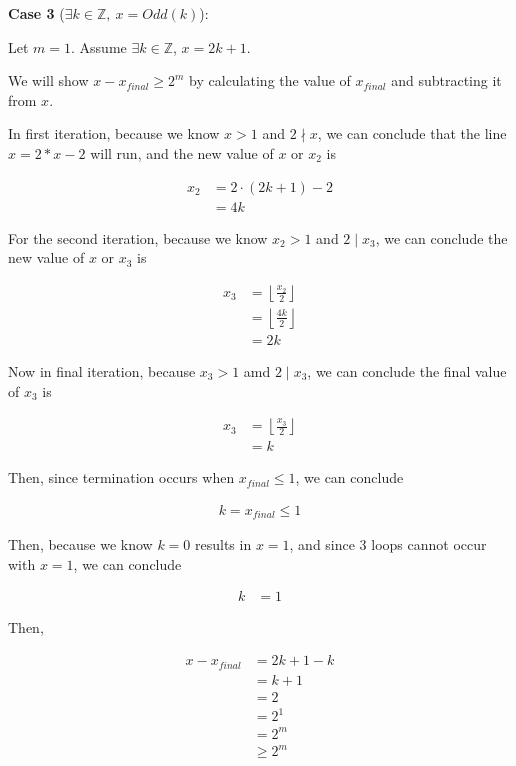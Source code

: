 \documentclass[12pt]{article}
\begin{document}
\begin{enumerate}[a.]
    \textbf{Case 3} ($\exists k \in \mathbb{Z},\:x = Odd(k)$):

    \bigskip

    Let $m = 1$. Assume $\exists k \in \mathbb{Z}$, $x = 2k + 1$.

    \bigskip

    We will show $x - x_{final} \geq 2^m$ by calculating the value of $x_{final}$
    and subtracting it from $x$.

    \bigskip

    In first iteration, because we know $x > 1$ and $2 \nmid x$, we can conclude
    that the line $x = 2 * x - 2$ will run, and the new value of $x$ or $x_2$ is

    \begin{align}
        x_2 &= 2 \cdot (2k + 1) - 2 \\
        &= 4k
    \end{align}

    \bigskip

    For the second iteration, because we know $x_2 > 1$ and $2 \mid x_3$, we can
    conclude the new value of $x$ or $x_3$ is

    \begin{align}
        x_3 &= \left\lfloor \frac{x_2}{2} \right\rfloor\\
        &= \left\lfloor \frac{4k}{2} \right\rfloor\\
        &= 2k
    \end{align}

    \bigskip

    Now in final iteration, because $x_3 > 1$ amd $2 \mid x_3$, we can conclude
    the final value of $x_3$ is

    \begin{align}
        x_3 &= \left\lfloor \frac{x_3}{2} \right\rfloor\\
        &= k
    \end{align}

    \bigskip

    Then, since termination occurs when $x_{final} \leq 1$, we can conclude

    \begin{align}
        k = x_{final} \leq 1
    \end{align}

    \bigskip

    Then, because we know $k = 0$ results in $x = 1$, and since 3 loops cannot
    occur with $x = 1$, we can conclude

    \begin{align}
        k &= 1
    \end{align}

    \bigskip

    Then,

    \begin{align}
        x - x_{final} &= 2k + 1 - k\\
        &= k + 1\\
        &= 2\\
        &= 2^1\\
        &= 2^m\\
        &\geq 2^m
    \end{align}

\end{enumerate}
\end{document}
